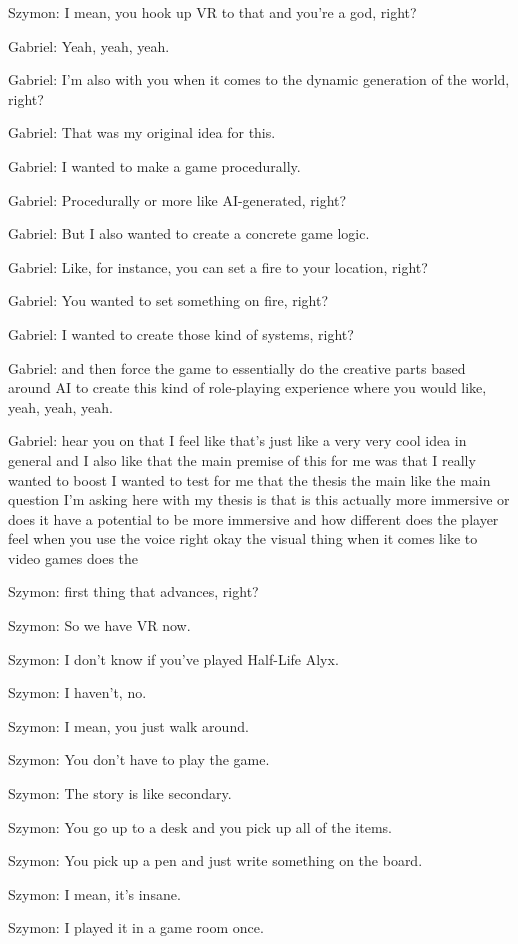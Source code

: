 Szymon: I mean, you hook up VR to that and you're a god, right?

Gabriel: Yeah, yeah, yeah.

Gabriel: I'm also with you when it comes to the dynamic generation of the world, right?

Gabriel: That was my original idea for this.

Gabriel: I wanted to make a game procedurally.

Gabriel: Procedurally or more like AI-generated, right?

Gabriel: But I also wanted to create a concrete game logic.

Gabriel: Like, for instance, you can set a fire to your location, right?

Gabriel: You wanted to set something on fire, right?

Gabriel: I wanted to create those kind of systems, right?

Gabriel: and then force the game to essentially do the creative parts based around AI to create this kind of role-playing experience where you would like, yeah, yeah, yeah.

Gabriel: hear you on that I feel like that's just like a very very cool idea in general and I also like that the main premise of this for me was that I really wanted to boost I wanted to test for me that the thesis the main like the main question I'm asking here with my thesis is that is this actually more immersive or does it have a potential to be more immersive and how different does the player feel when you use the voice right okay the visual thing when it comes like to video games does the

Szymon: first thing that advances, right?

Szymon: So we have VR now.

Szymon: I don't know if you've played Half-Life Alyx.

Szymon: I haven't, no.

Szymon: I mean, you just walk around.

Szymon: You don't have to play the game.

Szymon: The story is like secondary.

Szymon: You go up to a desk and you pick up all of the items.

Szymon: You pick up a pen and just write something on the board.

Szymon: I mean, it's insane.

Szymon: I played it in a game room once.


